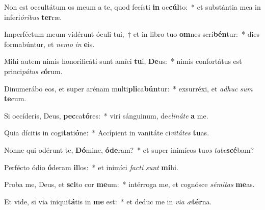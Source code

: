 \item Non est occultátum os meum a te, quod fecísti \textbf{in} oc\textbf{cúl}to:~* et substántia mea in inferi\textit{ó}\textit{ri}\textit{bus} \textbf{ter}ræ.
\item Imperféctum meum vidérunt óculi tui,~† et in libro tuo \textbf{om}nes scri\textbf{bén}tur:~* dies formabúntur, et \textit{ne}\textit{mo} \textit{in} \textbf{e}is.
\item Mihi autem nimis honorificáti sunt amíci \textbf{tu}i, \textbf{De}us:~* nimis confortátus est princi\textit{pá}\textit{tus} \textit{e}\textbf{ó}rum.
\item Dinumerábo eos, et super arénam multi\textbf{pli}ca\textbf{bún}tur:~* exsurréxi, et \textit{ad}\textit{huc} \textit{sum} \textbf{te}cum.
\item Si occíderis, Deus, \textbf{pec}ca\textbf{tó}res:~* viri sánguinum, de\textit{cli}\textit{ná}\textit{te} \textbf{a} me.
\item Quia dícitis in cogi\textbf{ta}ti\textbf{ó}ne:~* Accípient in vanitáte ci\textit{vi}\textit{tá}\textit{tes} \textbf{tu}as.
\item Nonne qui odérunt te, \textbf{Dó}mine, \textbf{ó}\textbf{de}ram?~* et super inimícos tu\textit{os} \textit{ta}\textit{be}\textbf{scé}bam?
\item Perfécto ódio \textbf{ó}deram \textbf{il}los:~* et inimíci \textit{fac}\textit{ti} \textit{sunt} \textbf{mi}hi.
\item Proba me, Deus, et \textbf{sci}to cor \textbf{me}um:~* intérroga me, et cognósce \textit{sé}\textit{mi}\textit{tas} \textbf{me}as.
\item Et vide, si via iniqui\textbf{tá}tis in \textbf{me} est:~* et deduc me in \textit{vi}\textit{a} \textit{æ}\textbf{tér}na.
